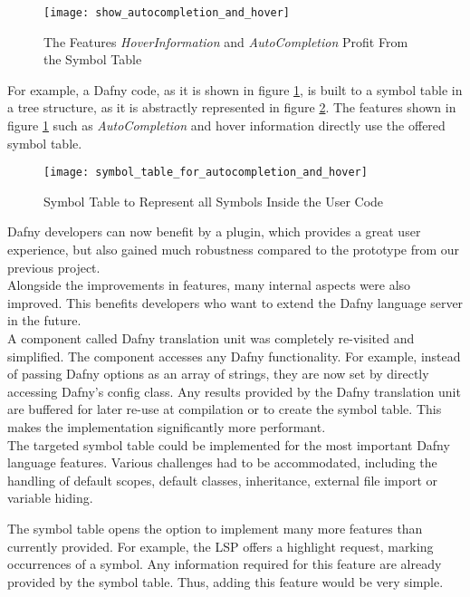 \begin{figure}[H]
    \centering
    \texttt{[image: show\_autocompletion\_and\_hover]}
    \caption{The Features \textit{HoverInformation} and \textit{AutoCompletion} Profit From the Symbol Table}
    \label{fig:show_autocompletion_and_hover}
\end{figure}

For example, a Dafny code, as it is shown in figure \ref{fig:show_autocompletion_and_hover},
is built to a symbol table in a tree structure, as it is abstractly represented in figure \ref{fig:symbol_table_for_autocompletion_and_hover}.
The features shown in figure \ref{fig:show_autocompletion_and_hover} such as \textit{AutoCompletion} and hover information directly use the offered symbol table.

\begin{figure}[H]
    \centering
    \texttt{[image: symbol\_table\_for\_autocompletion\_and\_hover]}
    \caption{Symbol Table to Represent all Symbols Inside the User Code}
    \label{fig:symbol_table_for_autocompletion_and_hover}
\end{figure}

Dafny developers can now benefit by a plugin, which provides a great user experience,
but also gained much robustness compared to the prototype from our previous project.\\

Alongside the improvements in features, many internal aspects were also improved.
This benefits developers who want to extend the Dafny language server in the future.\\

A component called Dafny translation unit was completely re-visited and simplified.
The component accesses any Dafny functionality.
For example, instead of passing Dafny options as an array of strings, they are now set by
directly accessing Dafny's config class.
Any results provided by the Dafny translation unit are buffered for later re-use at compilation or to create the symbol table.
This makes the implementation significantly more performant.\\

The targeted symbol table could be implemented for the most important Dafny language features.
Various challenges had to be accommodated, including the handling of default scopes, default classes, inheritance, external file import or variable hiding.

The symbol table opens the option to implement many more features than currently provided.
For example, the LSP offers a highlight request, marking occurrences of a symbol.
Any information required for this feature are already provided by the symbol table.
Thus, adding this feature would be very simple.

